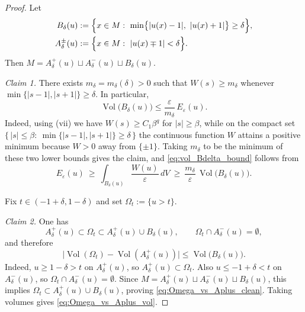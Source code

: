 \documentclass[10pt,a4paper]{amsart}
\begin{document}
\begin{proof}
Let
\[
\begin{aligned}
B_\delta(u)
&:=\Bigl\{x\in M:\ 
\min\bigl\{|u(x)-1|,\ |u(x)+1|\bigr\}\ge \delta\Bigr\},\\
A^\pm_\delta(u)
&:=\Bigl\{x\in M:\ |u(x)\mp 1|<\delta\Bigr\}.
\end{aligned}
\]
Then $M=A^+_\delta(u)\sqcup A^-_\delta(u)\sqcup B_\delta(u)$.

\smallskip
\noindent\emph{Claim 1.} There exists $m_\delta=m_\delta(\delta)>0$ such that
$W(s)\ge m_\delta$ whenever $\min\{|s-1|,|s+1|\}\ge\delta$. In particular,
\begin{equation}\label{eq:vol_Bdelta_bound}
\operatorname{Vol}\bigl(B_\delta(u)\bigr)\le \frac{\varepsilon}{m_\delta}\,E_\varepsilon(u).
\end{equation}
Indeed, using {\rm (vii)} we have $W(s)\ge C_1\beta^q$ for $|s|\ge \beta$, while on the compact set
$\{\,|s|\le\beta:\ \min\{|s-1|,|s+1|\}\ge\delta\,\}$ the continuous function $W$ attains a positive minimum
because $W>0$ away from $\{\pm1\}$. Taking $m_\delta$ to be the minimum of these two lower bounds gives the claim,
and \eqref{eq:vol_Bdelta_bound} follows from
\[
E_\varepsilon(u)\ \ge\ \int_{B_\delta(u)}\frac{W(u)}{\varepsilon}\,dV\ \ge\ \frac{m_\delta}{\varepsilon}\,\operatorname{Vol}\bigl(B_\delta(u)\bigr).
\]

\smallskip
Fix $t\in(-1+\delta,1-\delta)$ and set $\Omega_t:=\{u>t\}$.

\smallskip
\noindent\emph{Claim 2.} One has
\begin{equation}\label{eq:Omega_vs_Aplus_clean}
A^+_\delta(u)\subset \Omega_t\subset A^+_\delta(u)\cup B_\delta(u),
\qquad
\Omega_t\cap A^-_\delta(u)=\emptyset,
\end{equation}
and therefore
\begin{equation}\label{eq:Omega_vs_Aplus_vol}
\bigl|\operatorname{Vol}(\Omega_t)-\operatorname{Vol}(A^+_\delta(u))\bigr|\le \operatorname{Vol}\bigl(B_\delta(u)\bigr).
\end{equation}
Indeed, $u\ge 1-\delta>t$ on $A^+_\delta(u)$, so $A^+_\delta(u)\subset \Omega_t$.
Also $u\le -1+\delta<t$ on $A^-_\delta(u)$, so $\Omega_t\cap A^-_\delta(u)=\emptyset$.
Since $M=A^+_\delta(u)\sqcup A^-_\delta(u)\sqcup B_\delta(u)$, this implies
$\Omega_t\subset A^+_\delta(u)\cup B_\delta(u)$, proving \eqref{eq:Omega_vs_Aplus_clean}.
Taking volumes gives \eqref{eq:Omega_vs_Aplus_vol}.


\end{proof}
\end{document}
